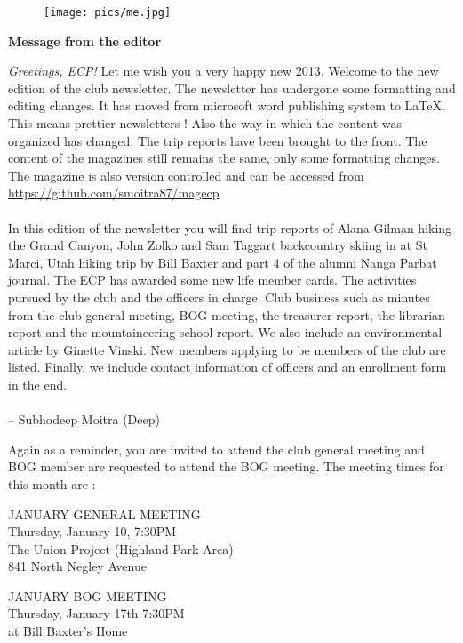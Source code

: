 \documentclass[10pt,a4paper]{article}
\newcommand{\NewsItem}[1]{%
		\usefont{T1}{augie}{m}{n} 	
		\large \bf #1 \vspace{4pt}
		\par \normalsize \normalfont}
\begin{document}
\begin{center}
\begin{minipage}[h]{0.8\linewidth}
	\begin{figure}
		\texttt{[image: pics/me.jpg]}
		\\%
	\end{figure}
	
	\NewsItem{Message from the editor}
	\emph{Greetings, ECP!} Let me wish you a very happy new 2013. Welcome to the new edition of the club newsletter. The newsletter has undergone some formatting and editing changes. It has moved from microsoft word publishing system to \LaTeX. This means prettier newsletters ! Also the way in which the content was organized has changed. The trip reports have been brought to the front. The content of the magazines still remains the same, only some formatting changes. The magazine is also version controlled and can be accessed from \url{https://github.com/smoitra87/magecp} 	
\\
\\
	In this edition of the newsletter you will find trip reports of Alana Gilman hiking the Grand Canyon, John Zolko and Sam Taggart backcountry skiing in at St Marci, Utah hiking trip by Bill Baxter and part 4 of the alumni Nanga Parbat journal. The ECP has awarded some new life member cards. The activities pursued by the club and the officers in charge. Club business such as minutes from the club general meeting, BOG meeting, the treasurer report, the librarian report and the mountaineering school report. We also include an environmental article by Ginette Vinski. New members applying to be members of the club are listed. Finally, we include contact information of officers and an enrollment form in the end. 
\\
\\
-- Subhodeep Moitra (Deep)

\vspace{0.5cm}

	Again as a reminder, you are invited to attend the club general meeting and BOG member are requested to attend the BOG meeting. The meeting times for this month are :
	
\vspace{1cm}

\begin{multicols}{2}
\Large
JANUARY GENERAL MEETING\\
Thursday, January 10, 7:30PM\\
The Union Project (Highland Park Area)\\
841 North Negley Avenue

JANUARY BOG MEETING\\
Thursday, January 17th 7:30PM\\
at Bill Baxter's Home



\normalsize
\end{multicols}
	
\end{minipage}
\end{center}
\end{document}
